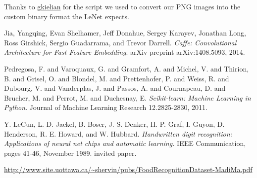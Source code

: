 \documentclass[leqno]{article}
\begin{document}
Thanks to
\href{https://github.com/gskielian/JPG-PNG-to-MNIST-NN-Format/blob/master/LICENSE}{gkielian}
for the script we used to convert our PNG images into the custom binary format
the LeNet expects.

\begin{thebibliography}{9}
Jia, Yangqing, Evan Shelhamer, Jeff Donahue, Sergey Karayev, Jonathan Long, Ross Girshick, Sergio Guadarrama, and Trevor Darrell.
\textit{Caffe: Convolutional Architecture for Fast Feature Embedding}.
arXiv preprint arXiv:1408.5093, 2014.


Pedregosa, F. and Varoquaux, G. and Gramfort, A. and Michel, V.
         and Thirion, B. and Grisel, O. and Blondel, M. and Prettenhofer, P.
         and Weiss, R. and Dubourg, V. and Vanderplas, J. and Passos, A. and
         Cournapeau, D. and Brucher, M. and Perrot, M. and Duchesnay, E.
         \textit{Scikit-learn: Machine Learning in Python}. Journal of Machine
         Learning Research 12.2825-2830, 2011.

   Y. LeCun, L. D. Jackel, B. Boser, J. S. Denker, H. P. Graf, I. Guyon, D.
   Henderson, R. E. Howard, and W. Hubbard. \textit{Handwritten digit
   recognition: Applications of neural net chips and automatic learning.} IEEE Communication, pages 41-46, November 1989. invited paper.

 \url{http://www.site.uottawa.ca/~shervin/pubs/FoodRecognitionDataset-MadiMa.pdf}
\end{thebibliography}
\end{document}
